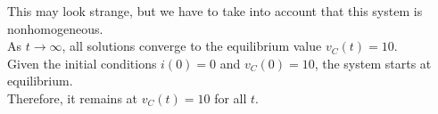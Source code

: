 \documentclass[preview]{standalone}
\begin{document}
\begin{center}
This may look strange, but we have to take into account that this system is nonhomogeneous.\\
                        As $t \rightarrow \infty$, all solutions converge to the equilibrium value $v_C(t) = 10$. \\
                        Given the initial conditions $i(0) = 0$ and $v_C(0) = 10$, the system starts at equilibrium. \\
                        Therefore, it remains at $v_C(t) = 10$ for all $t$.
\end{center}
\end{document}
